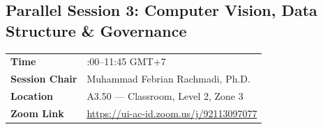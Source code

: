 \documentclass[10pt,a4paper]{article}
\begin{document}
\clearpage
\subsection[Parallel Session 3: Computer Vision, Data Structure \& Governance]{\color{conf}Parallel Session 3: Computer Vision, Data Structure \& Governance}

\begin{tabularx}{\textwidth}{
    >{\raggedright\arraybackslash}p{3.4cm}
    >{\raggedright\arraybackslash}X
}
\rowcolor{lightgraybg}
\textbf{Time} & 10:00--11:45 GMT+7 \\

\rowcolor{lightgraybg}
\textbf{Session Chair} & Muhammad Febrian Rachmadi, Ph.D. \\

\rowcolor{lightgraybg}
\textbf{Location} & A3.50 --- Classroom, Level 2, Zone 3 \\

\rowcolor{lightgraybg}
\textbf{Zoom Link} & \href{https://ui-ac-id.zoom.us/j/92113097077?pwd=jAt5Zth31Z4aoYJNMMZa84hHgPhfab.1}
{https://ui-ac-id.zoom.us/j/92113097077} \\
\end{tabularx}

\vspace{0.5em}

\small
\renewcommand{\arraystretch}{1.25}
\setlength{\tabcolsep}{5pt}
\end{document}

